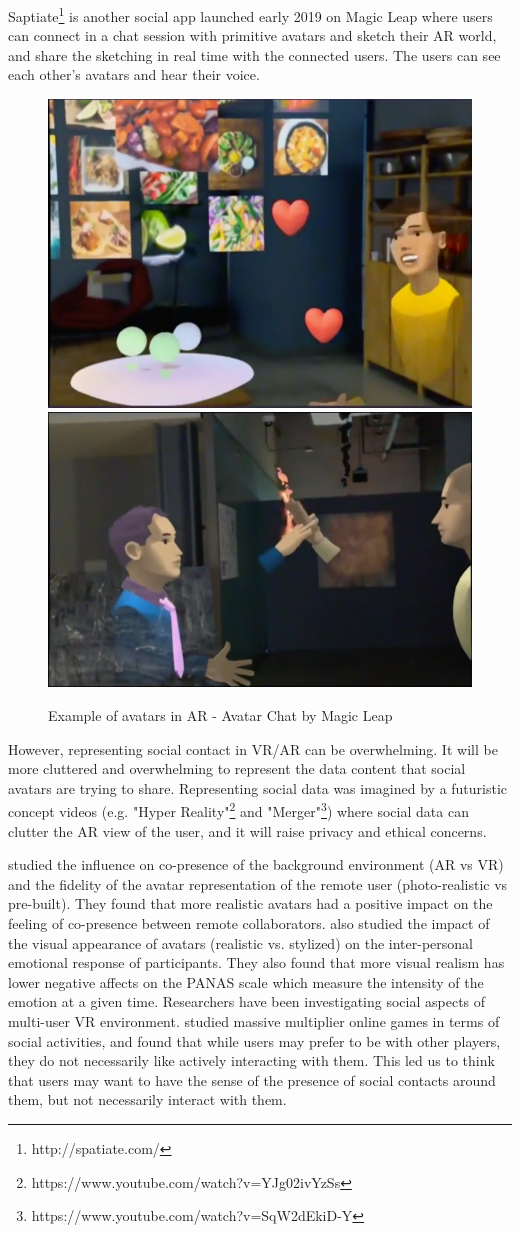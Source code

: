 Saptiate\footnote{http://spatiate.com/} is another social app launched early 2019 on Magic Leap where users can connect in a chat session with primitive avatars and sketch their AR world, and share the sketching in real time with the connected users. The users can see each other's avatars and hear their voice. 

\begin{figure}
    \centering
    \includegraphics[width=.4\linewidth]{images/avatar-chat-1.png}
    \includegraphics[width=.4\linewidth]{images/avatar-chat-2.png}
    \caption{Example of avatars in AR - Avatar Chat by Magic Leap}
    \label{fig:facebook-spaces}
\end{figure}

However, representing social contact in VR/AR can be overwhelming. It will be more cluttered and overwhelming to represent the data content that social avatars are trying to share. Representing social data was imagined by a futuristic concept videos (e.g. "Hyper Reality"\footnote{https://www.youtube.com/watch?v=YJg02ivYzSs} and "Merger"\footnote{https://www.youtube.com/watch?v=SqW2dEkiD-Y}) where social data can clutter the AR view of the user, and it will raise privacy and ethical concerns. 

\cite{Jo2016} studied the influence on co-presence of the background environment (AR vs VR) and the fidelity of the avatar representation of the remote user (photo-realistic vs pre-built). They found that more realistic avatars had a positive impact on the feeling of co-presence between remote collaborators. \cite{Volante2016} also studied the impact of the visual appearance of avatars (realistic vs. stylized) on the inter-personal emotional response of participants. They also found that more visual realism has lower negative affects on the PANAS scale which measure the intensity of the emotion at a given time. 
Researchers have been investigating social aspects of multi-user VR environment. \cite{Ducheneaut2006} studied massive multiplier online games in terms of social activities, and found that while users may prefer to be with other players, they do not necessarily like actively interacting with them. This led us to think that users may want to have the sense of the presence of social contacts around them, but not necessarily interact with them.

